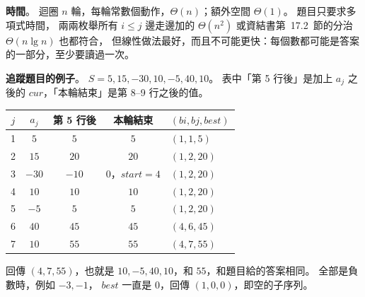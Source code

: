\begin{pastsoln}
\textbf{時間}。 迴圈 $n$ 輪，每輪常數個動作，$\Theta(n)$；額外空間 $\Theta(1)$。 題目只要求多項式時間，
兩兩枚舉所有 $i \le j$ 邊走邊加的 $\Theta(n^2)$ 或資結書第~17.2~節的分治 $\Theta(n \lg n)$ 也都符合，
但線性做法最好，而且不可能更快：每個數都可能是答案的一部分，至少要讀過一次。

\textbf{追蹤題目的例子}。 $S = 5, 15, -30, 10, -5, 40, 10$。 表中「第 5 行後」是加上 $a_j$ 之後的
$\mathit{cur}$，「本輪結束」是第 8--9 行之後的值。
\begin{center}
\begin{tabular}{ccccl}
\toprule
$j$ & $a_j$ & 第 5 行後 & 本輪結束 & $(\mathit{bi}, \mathit{bj}, \mathit{best})$ \\
\midrule
1 & $5$ & $5$ & $5$ & $(1, 1, 5)$ \\
2 & $15$ & $20$ & $20$ & $(1, 2, 20)$ \\
3 & $-30$ & $-10$ & $0$，$\mathit{start} = 4$ & $(1, 2, 20)$ \\
4 & $10$ & $10$ & $10$ & $(1, 2, 20)$ \\
5 & $-5$ & $5$ & $5$ & $(1, 2, 20)$ \\
6 & $40$ & $45$ & $45$ & $(4, 6, 45)$ \\
7 & $10$ & $55$ & $55$ & $(4, 7, 55)$ \\
\bottomrule
\end{tabular}
\end{center}
回傳 $(4, 7, 55)$，也就是 $10, -5, 40, 10$，和 $55$，和題目給的答案相同。 全部是負數時，例如 $-3, -1$，
$\mathit{best}$ 一直是 $0$，回傳 $(1, 0, 0)$，即空的子序列。
\end{pastsoln}
